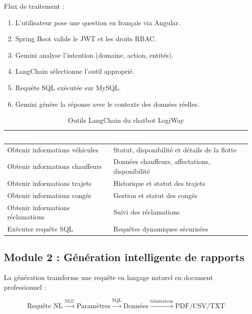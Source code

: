 \documentclass[12pt,a4paper]{report}
\newcommand{\thead}[1]{\cellcolor{tablehead}\textcolor{white}{\textbf{#1}}}
\begin{document}
Flux de traitement :
\begin{enumerate}
  \item L'utilisateur pose une question en français via Angular.
  \item Spring Boot valide le JWT et les droits RBAC.
  \item Gemini analyse l'intention (domaine, action, entités).
  \item LangChain sélectionne l'outil approprié.
  \item Requête SQL exécutée sur MySQL.
  \item Gemini génère la réponse avec le contexte des données réelles.
\end{enumerate}

\begin{table}[H]
  \centering
  \caption{Outils LangChain du chatbot LogiWay}
  \label{tab:langchain_tools}
  \begin{tabularx}{\textwidth}{|l|Y|}
    \hline
    \thead{Outil} & \thead{Fonction} \\
    \hline
    Obtenir informations véhicules & Statut, disponibilité et détails de la flotte \\
    Obtenir informations chauffeurs & Données chauffeurs, affectations, disponibilité \\
    Obtenir informations trajets & Historique et statut des trajets \\
    Obtenir informations congés & Gestion et statut des congés \\
    Obtenir informations réclamations & Suivi des réclamations \\
    Exécuter requête SQL & Requêtes dynamiques sécurisées \\
    \hline
  \end{tabularx}
\end{table}

\subsection{Module 2 : Génération intelligente de rapports}

La génération transforme une requête en langage naturel en document
professionnel :

\[
  \text{Requête NL} \xrightarrow{\text{NLU}} \text{Paramètres}
  \xrightarrow{\text{SQL}} \text{Données}
  \xrightarrow{\text{Générateur}} \text{PDF/CSV/TXT}
\]
\end{document}
